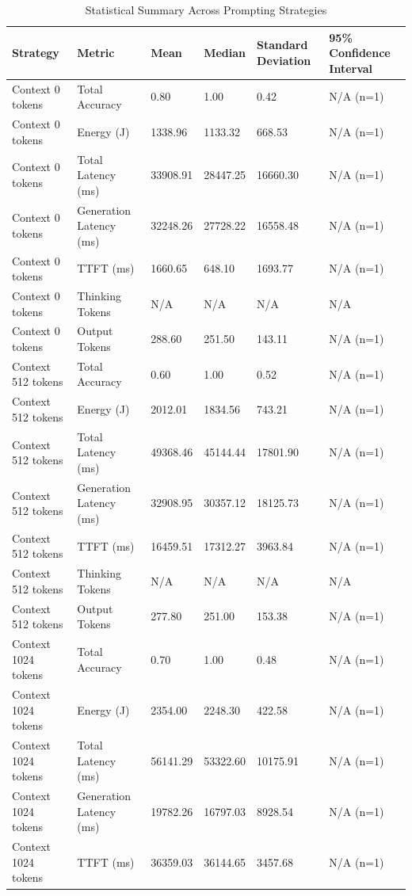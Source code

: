 \begin{table}
\caption{Statistical Summary Across Prompting Strategies}
\label{tab:statistical_summary}
\begin{tabular}{llllll}
\toprule
Strategy & Metric & Mean & Median & Standard Deviation & 95\% Confidence Interval \\
\midrule
Context 0 tokens & Total Accuracy & 0.80 & 1.00 & 0.42 & N/A (n=1) \\
Context 0 tokens & Energy (J) & 1338.96 & 1133.32 & 668.53 & N/A (n=1) \\
Context 0 tokens & Total Latency (ms) & 33908.91 & 28447.25 & 16660.30 & N/A (n=1) \\
Context 0 tokens & Generation Latency (ms) & 32248.26 & 27728.22 & 16558.48 & N/A (n=1) \\
Context 0 tokens & TTFT (ms) & 1660.65 & 648.10 & 1693.77 & N/A (n=1) \\
Context 0 tokens & Thinking Tokens & N/A & N/A & N/A & N/A \\
Context 0 tokens & Output Tokens & 288.60 & 251.50 & 143.11 & N/A (n=1) \\
Context 512 tokens & Total Accuracy & 0.60 & 1.00 & 0.52 & N/A (n=1) \\
Context 512 tokens & Energy (J) & 2012.01 & 1834.56 & 743.21 & N/A (n=1) \\
Context 512 tokens & Total Latency (ms) & 49368.46 & 45144.44 & 17801.90 & N/A (n=1) \\
Context 512 tokens & Generation Latency (ms) & 32908.95 & 30357.12 & 18125.73 & N/A (n=1) \\
Context 512 tokens & TTFT (ms) & 16459.51 & 17312.27 & 3963.84 & N/A (n=1) \\
Context 512 tokens & Thinking Tokens & N/A & N/A & N/A & N/A \\
Context 512 tokens & Output Tokens & 277.80 & 251.00 & 153.38 & N/A (n=1) \\
Context 1024 tokens & Total Accuracy & 0.70 & 1.00 & 0.48 & N/A (n=1) \\
Context 1024 tokens & Energy (J) & 2354.00 & 2248.30 & 422.58 & N/A (n=1) \\
Context 1024 tokens & Total Latency (ms) & 56141.29 & 53322.60 & 10175.91 & N/A (n=1) \\
Context 1024 tokens & Generation Latency (ms) & 19782.26 & 16797.03 & 8928.54 & N/A (n=1) \\
Context 1024 tokens & TTFT (ms) & 36359.03 & 36144.65 & 3457.68 & N/A (n=1) \\

\end{tabular}
\end{table}
